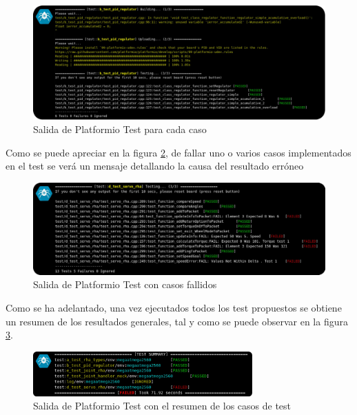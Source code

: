     \begin{figure}[H]
       	\centering
       	\includegraphics[width=1\textwidth]{figuras/Imagenes_SW/test/SWTest_1.jpg}
       	\caption{Salida de Platformio Test para cada caso}
       	\label{fig:SW:test:standard_output}
    \end{figure}

    Como se puede apreciar en la figura \ref{fig:SW:test:error_output}, de fallar uno o varios casos implementados en el test se verá un mensaje detallando la causa del resultado erróneo

    \begin{figure}[H]
        \centering
        \includegraphics[width=1\textwidth]{figuras/Imagenes_SW/test/SWTest_3.jpg}
        \caption{Salida de Platformio Test con casos fallidos}
        \label{fig:SW:test:error_output}
    \end{figure}

    Como se ha adelantado, una vez ejecutados todos los test propuestos se obtiene un resumen de los resultados generales, tal y como se puede observar en la figura \ref{fig:SW:test:sum_output}.

    \begin{figure}[H]
        \centering
        \includegraphics[width=0.75\textwidth]{figuras/Imagenes_SW/test/SWTest_6.jpg}
        \caption{Salida de Platformio Test con el resumen de los casos de test}
        \label{fig:SW:test:sum_output}
    \end{figure}

